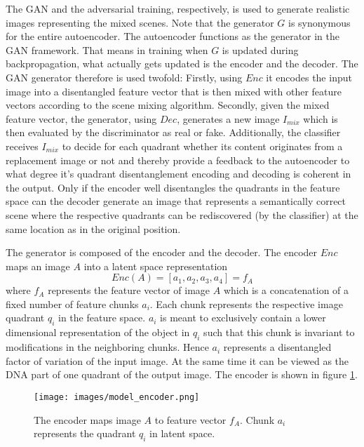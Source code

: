 \documentclass[11pt,a4paper]{article}
\begin{document}
The GAN and the adversarial training, respectively, is used to generate realistic images representing the mixed scenes. Note that the generator $G$ is synonymous for the entire autoencoder. The autoencoder functions as the generator in the GAN framework. That means in training when $G$ is updated during backpropagation, what actually gets updated is the encoder and the decoder. The GAN generator therefore is used twofold: Firstly, using $Enc$ it encodes the input image into a disentangled feature vector that is then mixed with other feature vectors according to the scene mixing algorithm. Secondly, given the mixed feature vector, the generator, using $Dec$, generates a new image $I_{mix}$ which is then evaluated by the discriminator as real or fake. Additionally, the classifier receives $I_{mix}$ to decide for each quadrant whether its content originates from a replacement image or not and thereby provide a feedback to the autoencoder to what degree it's quadrant disentanglement encoding and decoding is coherent in the output. Only if the encoder well disentangles the quadrants in the feature space can the decoder generate an image that represents a semantically correct scene where the respective quadrants can be rediscovered (by the classifier) at the same location as in the original position.

The generator is composed of the encoder and the decoder. The encoder $Enc$ maps an image $A$ into a latent space representation
\begin{equation} \label{eq:2}
    Enc(A) = [a_1, a_2, a_3, a_4] = f_A
\end{equation}
where $f_A$ represents the feature vector of image $A$ which is a concatenation of a fixed number of feature chunks $a_i$. Each chunk represents the respective image quadrant $q_i$ in the feature space. $a_i$ is meant to exclusively contain a lower dimensional representation of the object in $q_i$ such that this chunk is invariant to modifications in the neighboring chunks. Hence $a_i$ represents a disentangled factor of variation of the input image. At the same time it can be viewed as the DNA part of one quadrant of the output image. The encoder is shown in figure \ref{fig:encoder}.

\begin{figure}[h]
\centering
\texttt{[image: images/model\_encoder.png]}
\caption{The encoder maps image $A$ to feature vector $f_A$. Chunk $a_i$ represents the quadrant $q_i$ in latent space.}
\label{fig:encoder}
\end{figure}
\end{document}
